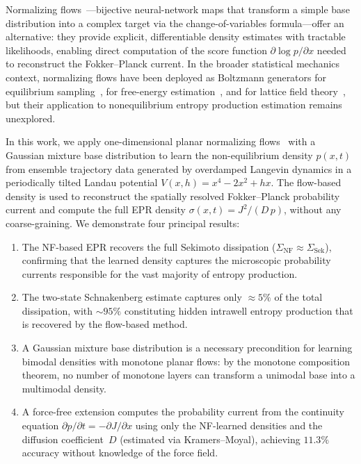 Normalizing flows~\cite{Rezende2015,Kobyzev2021,Papamakarios2021}---bijective neural-network maps that transform a simple base distribution into a complex target via the change-of-variables formula---offer an alternative: they provide explicit, differentiable density estimates with tractable likelihoods, enabling direct computation of the score function $\partial\log p/\partial x$ needed to reconstruct the Fokker--Planck current.
In the broader statistical mechanics context, normalizing flows have been deployed as Boltzmann generators for equilibrium sampling~\cite{Noe2019}, for free-energy estimation~\cite{Wirnsberger2020}, and for lattice field theory~\cite{Albergo2019}, but their application to nonequilibrium entropy production estimation remains unexplored.

In this work, we apply one-dimensional planar normalizing flows~\cite{Rezende2015} with a Gaussian mixture base distribution to learn the non-equilibrium density $p(x,t)$ from ensemble trajectory data generated by overdamped Langevin dynamics in a periodically tilted Landau potential $V(x,h) = x^4 - 2x^2 + hx$.
The flow-based density is used to reconstruct the spatially resolved Fokker--Planck probability current and compute the full EPR density $\sigma(x,t) = J^2/(D\,p)$, without any coarse-graining.
We demonstrate four principal results:
\begin{enumerate}
    \item The NF-based EPR recovers the full Sekimoto dissipation ($\Sigma_{\mathrm{NF}} \approx \Sigma_{\mathrm{Sek}}$), confirming that the learned density captures the microscopic probability currents responsible for the vast majority of entropy production.
    \item The two-state Schnakenberg estimate captures only $\approx\num{5}\%$ of the total dissipation, with $\sim\!\num{95}\%$ constituting hidden intrawell entropy production that is recovered by the flow-based method.
    \item A Gaussian mixture base distribution is a necessary precondition for learning bimodal densities with monotone planar flows: by the monotone composition theorem, no number of monotone layers can transform a unimodal base into a multimodal density.
    \item A force-free extension computes the probability current from the continuity equation $\partial p/\partial t = -\partial J/\partial x$ using only the NF-learned densities and the diffusion coefficient~$D$ (estimated via Kramers--Moyal), achieving $\num{11.3}\%$ accuracy without knowledge of the force field.
\end{enumerate}

